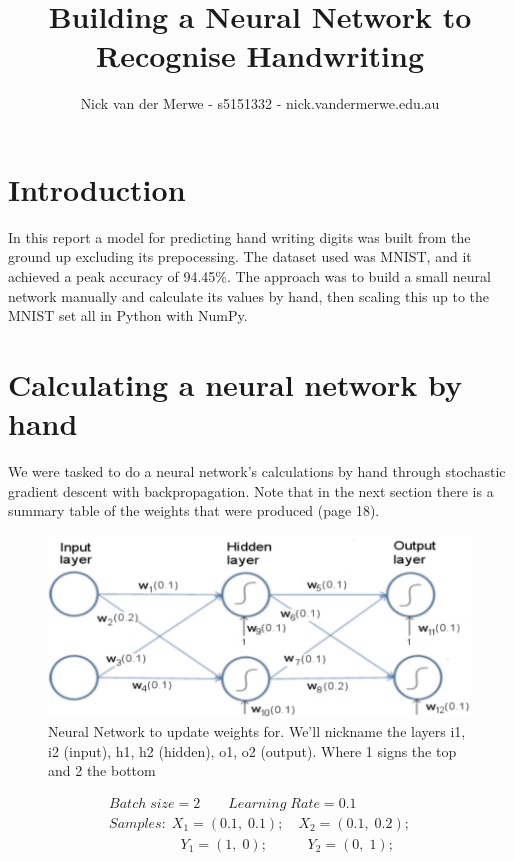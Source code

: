 \documentclass{article}
\title{Building a Neural Network to Recognise Handwriting}
\author{Nick van der Merwe - s5151332 - nick.vandermerwe\@griffithuni.edu.au}
\begin{document}
\maketitle

\section{Introduction}
In this report a model for predicting hand writing digits was built from the
ground up excluding its prepocessing. The dataset used was MNIST, and it
achieved a peak accuracy of 94.45\%. The approach was to build a small neural
network manually and calculate its values by hand, then scaling this up to the
MNIST set all in Python with NumPy.

\section{Calculating a neural network by hand}
We were tasked to do a neural network's calculations by hand through stochastic
gradient descent with backpropagation. Note that in the next section there is a
summary table of the weights that were produced (page 18).

\begin{figure}[ht]
    \centering
    \includegraphics[scale=0.5]{neurelNetwork.png}
    \caption{
        Neural Network to update weights for. We'll nickname the layers i1, i2
        (input), h1, h2 (hidden), o1, o2 (output). Where 1 signs the top and 2
        the bottom
    }
    \label{NN}
\end{figure}

\begin{equation*}
  \begin{array}{l}
    Batch \; size = 2 \qquad Learning \; Rate = 0.1 \\
    Samples: \; X_{1} = (0.1, \; 0.1); \quad X_{2} = (0.1, \; 0.2); \\
    \qquad \qquad \; \; \; \; Y_{1} = (1, \; 0); \qquad \; \; \;  Y_{2} = (0, \; 1);
  \end{array}
\end{equation*}
\end{document}
